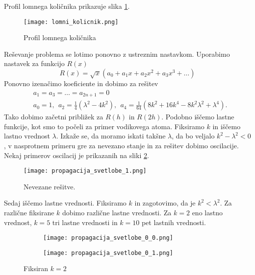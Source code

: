 \documentclass[12pt,a4paper]{article}
\begin{document}
Profil lomnega količnika prikazuje slika \ref{fig:slika6}.
\begin{figure}[H]
    \centering
        \texttt{[image: lomni\_kolicnik.png]}
    \caption{Profil lomnega količnika} \label{fig:slika6}
\end{figure}

Reševanje problema se lotimo ponovno z ustreznim nastavkom. Uporabimo nastavek za funkcijo $R(x)$
\begin{equation}
R(x)= \sqrt{x}(a_0 + a_1 x + a_2 x^{2} + a_3 x^{3} + \dots)
\end{equation}
Ponovno izenačimo koeficiente in dobimo za rešitev
\begin{align*}
& a_1 = a_3 = \dots= a_{2n+1}=0 \\
& a_0 =1, \ \ a_2 = \frac{1}{4}(\lambda^{2} - 4k^{2}) , \ \ a_4 = \frac{1}{64}(8k^{2} + 16 k^{4} - 8k^{2} \lambda^{2} + \lambda ^{4}).
\end{align*}
Tako dobimo začetni približek za $R(h)$ in $R(2h)$. Podobno iščemo lastne funkcije, kot smo to počeli za primer vodikovega atoma. Fiksiramo $k$ in iščemo lastno vrednost $\lambda$. Izkaže se, da moramo iskati takšne $\lambda$, da bo veljalo $k^{2} -\lambda^{2} <0$, v nasprotnem primeru gre za nevezano stanje in za rešitev dobimo oscilacije. Nekaj primerov oscilacij je prikazanih na sliki \ref{fig:slika7}. 

\begin{figure}[H]
    \centering
        \texttt{[image: propagacija\_svetlobe\_1.png]}
    \caption{Nevezane rešitve.} \label{fig:slika7}
\end{figure}

\noindent Sedaj iščemo lastne vrednosti. Fiksiramo $k$ in zagotovimo, da je $k^{2} < \lambda^{2}$. Za različne fiksirane $k$ dobimo različne lastne vrednosti. Za $k=2$ eno lastno vrednost, $k=5$ tri lastne vrednosti in $k=10$ pet lastnih vrednosti.



\begin{figure}[H]
    \centering
    \begin{subfigure}[b]{0.49\textwidth}
        \texttt{[image: propagacija\_svetlobe\_0\_0.png]}
    \end{subfigure}
    \begin{subfigure}[b]{0.49\textwidth}
        \texttt{[image: propagacija\_svetlobe\_0\_1.png]}
    \end{subfigure}
    \caption{Fiksiran $k=2$} \label{fig:slika8}
\end{figure}
\end{document}
